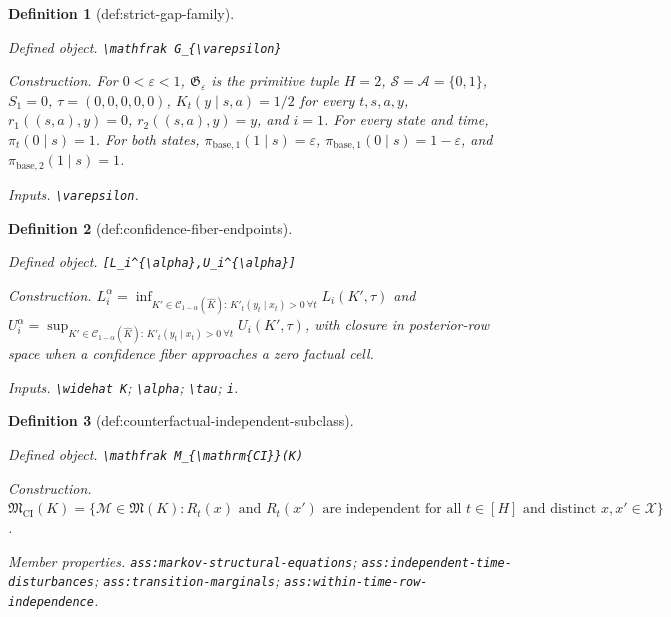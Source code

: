 \documentclass{article}
\newtheorem{definition}{Definition}
\begin{document}
\begin{definition}[def:strict-gap-family]\label{def:strict-gap-family}
\par\smallskip\noindent\emph{Defined object.} \texttt{\textbackslash{}\allowbreak{}mathfrak G\_\allowbreak{}\{\textbackslash{}\allowbreak{}varepsilon\}\allowbreak{}}
\par\smallskip\noindent\emph{Construction.} For \(0<\varepsilon<1\), \(\mathfrak G_{\varepsilon}\) is the primitive tuple \(H=2\), \(\mathcal S=\mathcal A=\{0,1\}\), \(S_1=0\), \(\tau=(0,0,0,0,0)\), \(K_t(y\mid s,a)=1/2\) for every \(t,s,a,y\), \(r_1((s,a),y)=0\), \(r_2((s,a),y)=y\), and \(i=1\). For every state and time, \(\pi_t(0\mid s)=1\). For both states, \(\pi_{\mathrm{base},1}(1\mid s)=\varepsilon\), \(\pi_{\mathrm{base},1}(0\mid s)=1-\varepsilon\), and \(\pi_{\mathrm{base},2}(1\mid s)=1\).
\par\smallskip\noindent\emph{Inputs.} \texttt{\textbackslash{}\allowbreak{}varepsilon}.
\end{definition}

\begin{definition}[def:confidence-fiber-endpoints]\label{def:confidence-fiber-endpoints}
\par\smallskip\noindent\emph{Defined object.} \texttt{[L\_\allowbreak{}i\textasciicircum{}\{\textbackslash{}\allowbreak{}alpha\}\allowbreak{},\allowbreak{}U\_\allowbreak{}i\textasciicircum{}\{\textbackslash{}\allowbreak{}alpha\}\allowbreak{}]}
\par\smallskip\noindent\emph{Construction.} \(L_i^{\alpha}=\inf_{K'\in\mathcal C_{1-\alpha}(\widehat K):\,K'_t(y_t\mid x_t)>0\ \forall t}L_i(K',\tau)\) and \(U_i^{\alpha}=\sup_{K'\in\mathcal C_{1-\alpha}(\widehat K):\,K'_t(y_t\mid x_t)>0\ \forall t}U_i(K',\tau)\), with closure in posterior-row space when a confidence fiber approaches a zero factual cell.
\par\smallskip\noindent\emph{Inputs.} \texttt{\textbackslash{}\allowbreak{}widehat K}; \texttt{\textbackslash{}\allowbreak{}alpha}; \texttt{\textbackslash{}\allowbreak{}tau}; \texttt{i}.
\end{definition}

\begin{definition}[def:counterfactual-independent-subclass]\label{def:counterfactual-independent-subclass}
\par\smallskip\noindent\emph{Defined object.} \texttt{\textbackslash{}\allowbreak{}mathfrak M\_\allowbreak{}\{\textbackslash{}\allowbreak{}mathrm\{CI\}\allowbreak{}\}\allowbreak{}(K)}
\par\smallskip\noindent\emph{Construction.} \(\mathfrak M_{\mathrm{CI}}(K)=\{\mathcal M\in\mathfrak M(K):R_t(x)\text{ and }R_t(x')\text{ are independent for all }t\in[H]\text{ and distinct }x,x'\in\mathcal X\}\).
\par\smallskip\noindent\emph{Member properties.} \texttt{ass:\allowbreak{}markov-\allowbreak{}structural-\allowbreak{}equations}; \texttt{ass:\allowbreak{}independent-\allowbreak{}time-\allowbreak{}disturbances}; \texttt{ass:\allowbreak{}transition-\allowbreak{}marginals}; \texttt{ass:\allowbreak{}within-\allowbreak{}time-\allowbreak{}row-\allowbreak{}independence}.
\end{definition}
\end{document}
